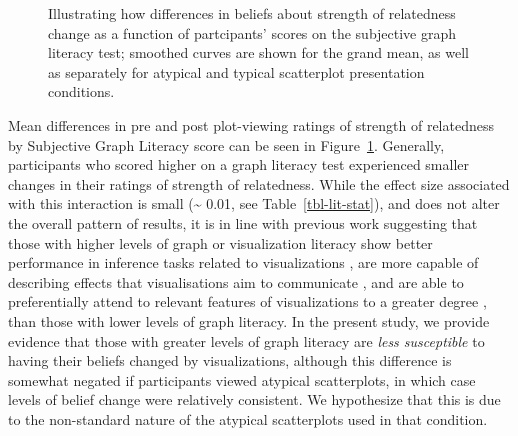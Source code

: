 \documentclass[manuscript,screen,review]{acmart}
\begin{document}
\begin{figure}


\caption{\label{fig-lit-smooth}Illustrating how differences in beliefs
about strength of relatedness change as a function of partcipants'
scores on the subjective graph literacy test; smoothed curves are shown
for the grand mean, as well as separately for atypical and typical
scatterplot presentation conditions.}

\end{figure}%

Mean differences in pre and post plot-viewing ratings of strength of
relatedness by Subjective Graph Literacy score can be seen in
Figure~\ref{fig-lit-smooth}. Generally, participants who scored higher
on a graph literacy test experienced smaller changes in their ratings of
strength of relatedness. While the effect size associated with this
interaction is small (\textasciitilde{} 0.01, see
Table~\ref{tbl-lit-stat}), and does not alter the overall pattern of
results, it is in line with previous work suggesting that those with
higher levels of graph or visualization literacy show better performance
in inference tasks related to visualizations \citep{canham_2010}, are
more capable of describing effects that visualisations aim to
communicate \citep{shah_2011}, and are able to preferentially attend to
relevant features of visualizations to a greater degree
\citep{okan_2016}, than those with lower levels of graph literacy. In
the present study, we provide evidence that those with greater levels of
graph literacy are \emph{less susceptible} to having their beliefs
changed by visualizations, although this difference is somewhat negated
if participants viewed atypical scatterplots, in which case levels of
belief change were relatively consistent. We hypothesize that this is
due to the non-standard nature of the atypical scatterplots used in that
condition.
\end{document}
